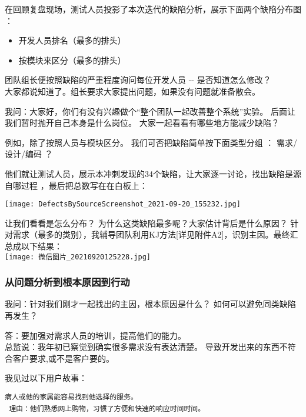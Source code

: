 在回顾复盘现场，测试人员投影了本次迭代的缺陷分析，展示下面两个缺陷分布图
：

\begin{itemize}
\tightlist
\item
  开发人员排名（最多的排头）
\item
  按模块来区分（最多的排头）
\end{itemize}

团队组长便按照缺陷的严重程度询问每位开发人员 -\/- 是否知道怎么修改？\\
大家都说知道了。组长要求大家提出问题，如果没有问题就准备散会。

我问：大家好，你们有没有兴趣做个``整个团队一起改善整个系统''实验。
后面让我们暂时抛开自己本身是什么岗位。
大家一起看看有哪些地方能减少缺陷？

例如，除了按照人员与模块区分。 我们可否把缺陷简单按下面类型分组 ：
需求/设计/编码 ？

他们就让测试人员，展示本冲刺发现的34个缺陷，让大家逐一讨论，找出缺陷是源自哪过程
，最后把总数写在在白板上：


\texttt{[image: DefectsBySourceScreenshot\_2021-09-20\_155232.jpg]}

让我们看看是怎么分布？ 为什么这类缺陷最多呢？大家估计背后是什么原因？
针对需求（最多的类别），我辅导团队利用KJ方法{[}详见附件A2{]}，识别主因。最终汇总成以下结果：\\

\texttt{[image: 微信图片\_20210920125228.jpg]}

\hypertarget{ux4eceux95eeux9898ux5206ux6790ux5230ux6839ux672cux539fux56e0ux5230ux884cux52a8}{%
\subsubsection{从问题分析到根本原因到行动}\label{ux4eceux95eeux9898ux5206ux6790ux5230ux6839ux672cux539fux56e0ux5230ux884cux52a8}}

我问：针对我们刚才一起找出的主因，根本原因是什么？
如何可以避免同类缺陷再发生？

答：要加强对需求人员的培训，提高他们的能力。\\
总监说：我年初已察觉到确实很多需求没有表达清楚。
导致开发出来的东西不符合客户要求,或不是客户要的。

我见过以下用户故事：

\texttt{病人或他的家属能容易找到他选择的服务。}\\
\texttt{~理由：他们熟悉网上购物，习惯了方便和快速的响应时间时间。}~\\

